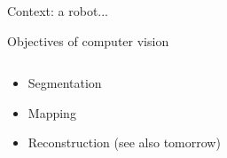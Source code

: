 \begin{frame}{Context: a robot...}

\end{frame}

\begin{frame}{Objectives of computer vision}%

\begin{columns}
\begin{column}{.5\linewidth}
\begin{itemize}
   \item<1-3> Segmentation
   \item<2-3> Mapping
   \item<3> Reconstruction (see also tomorrow)
\end{itemize}
\end{column}
\begin{column}{.5\linewidth}

\end{column}
\end{columns}

\end{frame}

